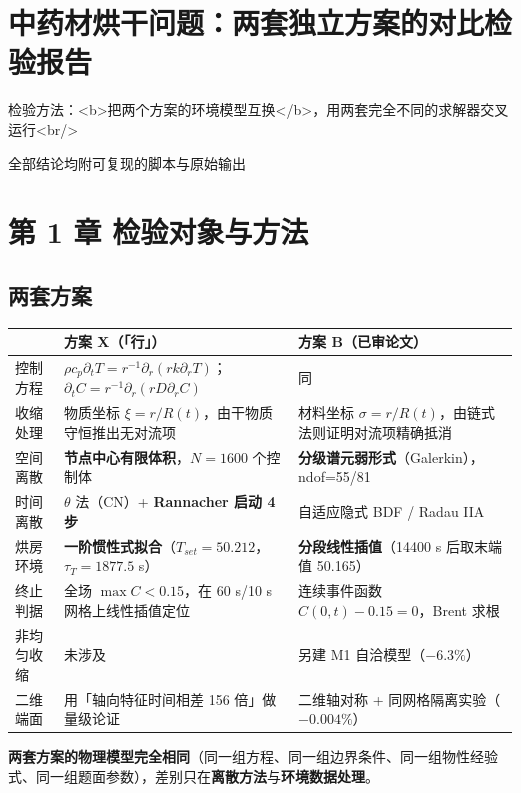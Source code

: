 
\section{中药材烘干问题：两套独立方案的对比检验报告}



检验方法：<b>把两个方案的环境模型互换</b>，用两套完全不同的求解器交叉运行<br/>

全部结论均附可复现的脚本与原始输出



\section{第 1 章 检验对象与方法}


\subsection{两套方案}


\begin{center}
\small
\begin{tabular}{lll}
\toprule
 & 方案 X（「行」） & 方案 B（已审论文） \\
\midrule
控制方程 & $\rho c_p\partial_tT=r^{-1}\partial_r(rk\partial_rT)$；$\partial_tC=r^{-1}\partial_r(rD\partial_rC)$ & 同 \\
收缩处理 & 物质坐标 $\xi=r/R(t)$，由干物质守恒推出无对流项 & 材料坐标 $\sigma=r/R(t)$，由链式法则证明对流项精确抵消 \\
空间离散 & \textbf{节点中心有限体积}，$N=1600$ 个控制体 & \textbf{分级谱元弱形式}（Galerkin），ndof=55/81 \\
时间离散 & $\theta$ 法（CN）+ \textbf{Rannacher 启动 4 步} & 自适应隐式 BDF / Radau IIA \\
烘房环境 & \textbf{一阶惯性式拟合}（$T_{set}=50.212$，$\tau_T=1877.5$ s） & \textbf{分段线性插值}（14400 s 后取末端值 50.165） \\
终止判据 & 全场 $\max C<0.15$，在 60 s/10 s 网格上线性插值定位 & 连续事件函数 $C(0,t)-0.15=0$，Brent 求根 \\
非均匀收缩 & 未涉及 & 另建 M1 自洽模型（$-6.3\%$） \\
二维端面 & 用「轴向特征时间相差 156 倍」做量级论证 & 二维轴对称 + 同网格隔离实验（$-0.004\%$） \\
\bottomrule
\end{tabular}
\end{center}


\textbf{两套方案的物理模型完全相同}（同一组方程、同一组边界条件、同一组物性经验式、同一组题面参数），差别只在\textbf{离散方法}与\textbf{环境数据处理}。


